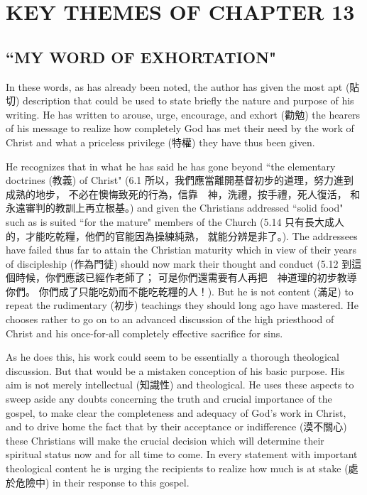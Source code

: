 \chapter{KEY THEMES OF CHAPTER 13}

\section{``MY WORD OF EXHORTATION"}
\Large
In these words, as has already been noted, the author has given the most apt
(貼切) description that could be used to state briefly the nature and purpose
of his writing.
He has written to arouse, urge, encourage, and exhort (勸勉) the hearers of his
message to realize how completely God has met their need by the work of Christ
and what a priceless privilege (特權) they have thus been given.

He recognizes that in what he has said he has gone beyond ``the elementary
doctrines (教義) of Christ"
{\large (6.1 所以，我們應當離開基督初步的道理，努力進到成熟的地步，
不必在懊悔致死的行為，信靠　神，洗禮，按手禮，死人復活，
和永遠審判的教訓上再立根基。)}
and given the Christians addressed ``solid food" such as is suited ``for the
mature" members of the Church
{\large (5.14 只有長大成人的，才能吃乾糧，他們的官能因為操練純熟，
就能分辨是非了。)}.
The addressees have failed thus far to attain the Christian maturity which in
view of their years of discipleship (作為門徒) should now mark their thought
and conduct
{\large (5.12 到這個時候，你們應該已經作老師了；
可是你們還需要有人再把　神道理的初步教導你們。
你們成了只能吃奶而不能吃乾糧的人！)}.
But he is not content (滿足) to repeat the rudimentary (初步) teachings they
should long ago have mastered.
He chooses rather to go on to an advanced discussion of the high priesthood of
Christ and his once-for-all completely effective sacrifice for sins.

As he does this, his work could seem to be essentially a thorough theological
discussion.
But that would be a mistaken conception of his basic purpose.
His aim is not merely intellectual (知識性) and theological.
He uses these aspects to sweep aside any doubts concerning the truth and
crucial importance of the gospel, to make clear the completeness and adequacy
of God's work in Christ, and to drive home the fact that by their acceptance or
indifference (漠不關心) these Christians will make the crucial decision which
will determine their spiritual status now and for all time to come.
In every statement with important theological content he is urging the
recipients to realize how much is at stake (處於危險中) in their response to
this gospel.

